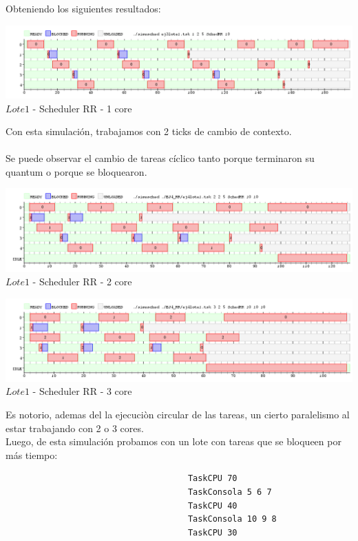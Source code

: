 Obteniendo los siguientes resultados:

\begin{center}

    
	\includegraphics[width=450pt]{./EJ4_RR/ejercicio4-1nucleo.png}
	{$Lote 1$ - Scheduler RR - 1 core}	
 
\end{center}


\indent Con esta simulación, trabajamos con 2 ticks de cambio de contexto.\\
\\
\indent Se puede observar el cambio de tareas cíclico tanto porque terminaron su quantum o porque se bloquearon.\\

\begin{center}
  	\includegraphics[width=450pt]{./EJ4_RR/ejercicio4-2nucleo.png}
	  {$Lote 1$ - Scheduler RR - 2 core}	
\end{center}

\begin{center}
  	\includegraphics[width=450pt]{./EJ4_RR/ejercicio4-3nucleo.png}
	  {$Lote 1$ - Scheduler RR - 3 core}	
\end{center}

\indent Es notorio, ademas del la ejecuciòn circular de las tareas, un cierto paralelismo al estar trabajando con
2 o 3 cores.\\

\indent Luego, de esta simulación probamos con un lote con tareas que se bloqueen por más tiempo:
 \begin{verbatim}
                                     TaskCPU 70
                                     TaskConsola 5 6 7
                                     TaskCPU 40
                                     TaskConsola 10 9 8
                                     TaskCPU 30
 \end{verbatim}

